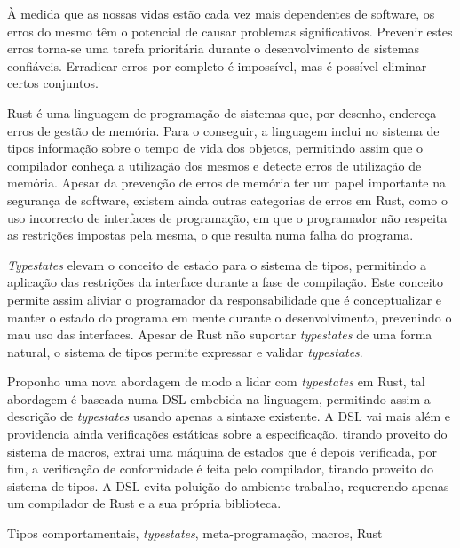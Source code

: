 

À medida que as nossas vidas estão cada vez mais dependentes de software,
os erros do mesmo têm o potencial de causar problemas significativos.
Prevenir estes erros torna-se uma tarefa prioritária durante o desenvolvimento de sistemas confiáveis.
Erradicar erros por completo é impossível, mas é possível eliminar certos conjuntos.

Rust é uma linguagem de programação de sistemas que, por desenho, endereça erros de gestão de memória.
Para o conseguir, a linguagem inclui no sistema de tipos informação sobre o tempo de vida dos objetos,
permitindo assim que o compilador conheça a utilização dos mesmos e detecte erros de utilização de memória.
Apesar da prevenção de erros de memória ter um papel importante na segurança de software,
existem ainda outras categorias de erros em Rust,
como o uso incorrecto de interfaces de programação, em que o programador não respeita as restrições impostas pela mesma, o que resulta numa falha do programa.

\emph{Typestates} elevam o conceito de estado para o sistema de tipos,
permitindo a aplicação das restrições da interface durante a fase de compilação.
Este conceito permite assim aliviar o programador da responsabilidade que é conceptualizar e manter o estado do programa em mente durante o desenvolvimento, prevenindo o mau uso das interfaces.
Apesar de Rust não suportar \emph{typestates} de uma forma natural,
o sistema de tipos permite expressar e validar \emph{typestates}.

Proponho uma nova abordagem de modo a lidar com \emph{typestates} em Rust,
tal abordagem é baseada numa \gls{DSL} embebida na linguagem,
permitindo assim a descrição de \emph{typestates} usando apenas a sintaxe existente.
A \gls{DSL} vai mais além e providencia ainda verificações estáticas sobre a especificação,
tirando proveito do sistema de macros, extrai uma máquina de estados que é depois verificada,
por fim, a verificação de conformidade é feita pelo compilador, tirando proveito do sistema de tipos.
A \gls{DSL} evita poluição do ambiente trabalho, requerendo apenas um compilador de Rust e a sua própria biblioteca.


\begin{keywords}
Tipos comportamentais, \emph{typestates}, meta-programação, macros, Rust
\end{keywords}
